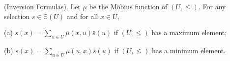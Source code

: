 (Inversion Formulas). Let $\mu$ be the Möbius function of $(U, \leq)$. For any selection $s \in \mathbb{S}(U)$ and for all $x \in U$,

(a) $s(x) = \sum_{u \in U} \mu(x, u) \bar{s}(u)$ if $(U, \leq)$ has a maximum element;

(b) $s(x) = \sum_{u \in U} \mu(u, x) \bar{s}(u)$ if $(U, \leq)$ has a minimum element.

